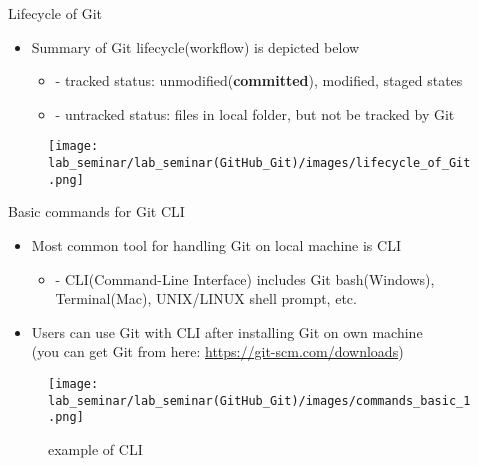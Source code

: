 \documentclass[11pt, xelatex]{beamer}
\newcommand{\bi}{\begin{itemize}}
\newcommand{\ei}{\end{itemize}}
\begin{document}
\begin{frame}{Lifecycle of Git}
\bi
\item Summary of Git lifecycle(workflow) is depicted below
    \bi
    \item[-] tracked status: unmodified(\textbf{committed}), modified, staged states
    \item[-] untracked status: files in local folder, but not be tracked by Git
    \ei
\ei
\begin{figure}
	\texttt{[image: lab\_seminar/lab\_seminar(GitHub\_Git)/images/lifecycle\_of\_Git.png]}
\end{figure}
\end{frame}

\begin{frame}{Basic commands for Git CLI}
\bi
\item Most common tool for handling Git on local machine is CLI
    \bi
    \item[-] CLI(Command-Line Interface) includes Git bash(Windows), Terminal(Mac), UNIX/LINUX shell prompt, etc.
    \ei
\item Users can use Git with CLI after installing Git on own machine\\
(you can get Git from here: \url{https://git-scm.com/downloads})
\ei
\begin{figure}
	\texttt{[image: lab\_seminar/lab\_seminar(GitHub\_Git)/images/commands\_basic\_1.png]}
	\caption{example of CLI}
\end{figure}
\end{frame}

\end{document}
